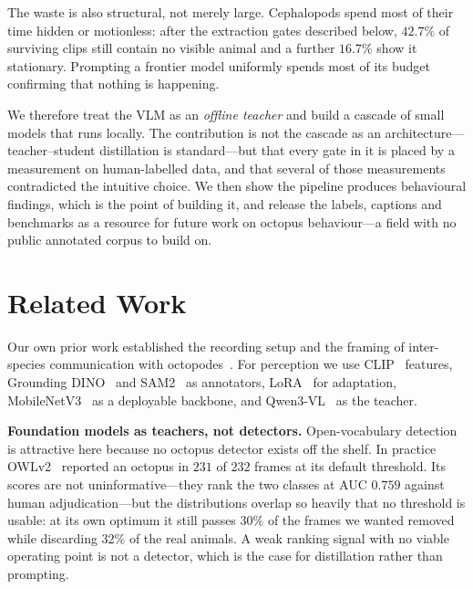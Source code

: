 \documentclass[conference]{IEEEtran}
\begin{document}
The waste is also structural, not merely large. Cephalopods spend most of their
time hidden or motionless: after the extraction gates described below,
$42.7\%$ of surviving clips still contain no visible animal and a further
$16.7\%$ show it stationary. Prompting a frontier model uniformly spends most of
its budget confirming that nothing is happening.

We therefore treat the VLM as an \emph{offline teacher} and build a cascade of
small models that runs locally. The contribution is not the cascade as an
architecture---teacher--student distillation is standard---but that every gate in
it is placed by a measurement on human-labelled data, and that several of those
measurements contradicted the intuitive choice. We then show the pipeline
produces behavioural findings, which is the point of building it, and release the
labels, captions and benchmarks as a resource for future work on octopus
behaviour---a field with no public annotated corpus to build on.

\section{Related Work}
Our own prior work established the recording setup and the framing of
inter-species communication with octopodes~\cite{disc_o}. For perception we use
CLIP~\cite{clip} features, Grounding DINO~\cite{groundingdino} and
SAM2~\cite{sam2} as annotators, LoRA~\cite{lora} for adaptation,
MobileNetV3~\cite{mobilenetv3} as a deployable backbone, and
Qwen3-VL~\cite{qwenvl} as the teacher.

\textbf{Foundation models as teachers, not detectors.} Open-vocabulary detection
is attractive here because no octopus detector exists off the shelf. In practice
OWLv2~\cite{owlv2} reported an octopus in $231$ of $232$ frames at its default
threshold. Its scores are not uninformative---they rank the two classes at AUC
$0.759$ against human adjudication---but the distributions overlap so heavily
that no threshold is usable: at its own optimum it still passes $30\%$ of the
frames we wanted removed while discarding $32\%$ of the real animals. A weak
ranking signal with no viable operating point is not a detector, which is the
case for distillation rather than prompting.
\end{document}
